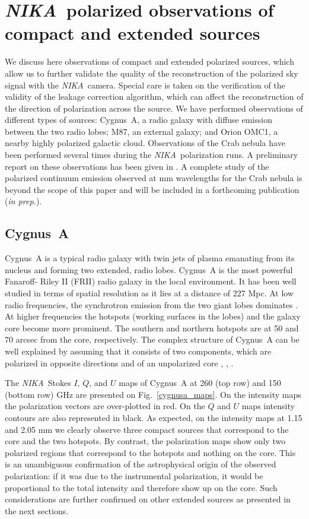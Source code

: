 \documentclass[twocolumn, traditabstract]{aa}
\newcommand{\nika}{{\it NIKA}}
\def\NIKA{\textit{NIKA}}
\begin{document}
 \section{\nika\ polarized observations of compact and extended sources}
 \label{sec:extended}
 We discuss here observations of compact and extended polarized sources, which
 allow us to further validate the quality of the reconstruction of the polarized
 sky signal with the \nika\ camera. Special care is taken on the verification of
 the validity of the leakage correction algorithm, which can affect the
 reconstruction of the direction of polarization across the source. We have
 performed observations of different types of sources: Cygnus~A, a radio galaxy
 with diffuse emission between the two radio lobes; M87, an external galaxy; and Orion OMC1, a nearby highly polarized galactic cloud. Observations of the Crab nebula have been performed several times
 during the \NIKA\ polarization runs. 
 A preliminary report on these observations has been given in \citep{Ritacco2015}.
 A complete study of the polarized continuum emission observed at mm wavelengths for the Crab nebula is 
 beyond the scope of this paper and will be included in a forthcoming publication ({\it in prep.}).

\subsection{Cygnus~A}
Cygnus~A is a typical radio galaxy with twin jets of plasma emanating from its
nucleus and forming two extended, radio lobes. Cygnus~A is the most
powerful Fanaroff- Riley II (FRII) radio galaxy in the local environment. It has
been well studied in terms of spatial resolution as it lies at a distance of 227
Mpc. At low radio frequencies, the synchrotron emission from the two giant lobes
dominates \citep{1974MNRAS.166..305H}. At higher frequencies the hotspots
(working surfaces in the lobes) and the galaxy core become more prominent. The
southern and northern hotspots are at 50 and 70 arcsec from the core,
respectively.  The complex structure of Cygnus~A can be well explained by
assuming that it consists of two components, which are polarized in opposite
directions and of an unpolarized core \cite{1967ApJ...150L..15S},
\cite{1966SvA....10..214S}, \cite{1968ApJ...151...53M}.
 
The \nika\ Stokes $I$, $Q$, and $U$ maps of Cygnus~A at 260
(top row) and 150 (bottom row) GHz are presented on Fig.~\ref{cygnusa_maps}.
On the intensity maps the polarization vectors are over-plotted in red. On the
$Q$ and $U$ maps intensity contours are also represented in black.  As expected,
on the intensity maps at 1.15 and 2.05 mm we clearly observe three compact
sources that correspond to the core and the two hotspots. By contrast, the
polarization maps show only two polarized regions that correspond to the hotspots and nothing on the core. This is an unambiguous confirmation of the
astrophysical origin of the observed polarization: if it was due to the instrumental
polarization, it would be proportional to the total intensity and therefore show up
on the core. Such considerations
are further confirmed on other extended sources as presented in the next sections.
\end{document}
